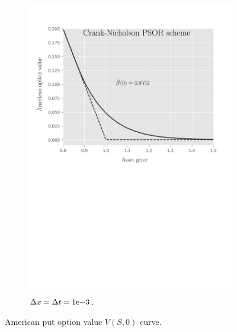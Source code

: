 \begin{figure}[tbp]
\begin{subfigure}{0.4\textwidth}
    \includegraphics[width=\textwidth]{chapters/chapter5/TestCase2CrankNicholsonLCP.pdf}
    \caption{$\Delta{x}=\Delta{t}={1}\mathrm{e}{-3}$.}
  \end{subfigure}
  \caption{American put option value $V(S, 0)$ curve.}
  \label{fig:lcp:numericaresults:test_case_2}
\end{figure}

